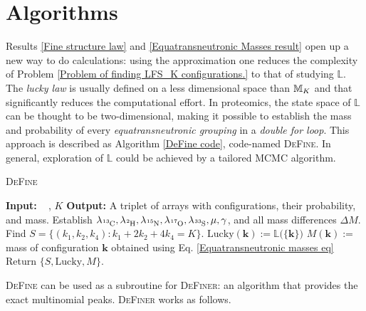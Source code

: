 \section{Algorithms}

Results \ref{Fine structure law} and \ref{Equatransneutronic Masses result} open up a new way to do calculations: using the approximation one reduces the complexity of Problem \ref{Problem of finding LFS_K configurations.} to that of studying $\mathbb{L}$. The {\it lucky law} is usually defined on a less dimensional space than $\mathbb{M}_K$ and that significantly reduces the  computational effort. In proteomics, the state space of $\mathbb{L}$ can be thought to be two-dimensional, making it possible to establish the mass and probability of every {\it equatransneutronic grouping} in a {\it double for loop}. This approach is described as Algorithm \ref{DeFine code}, code-named \textsc{DeFine}. In general, exploration of $\mathbb{L}$ could be achieved by a tailored MCMC algorithm.   

\begin{algorithm}\caption{\textsc{DeFine}}\label{DeFine code}
\begin{algorithmic}\label{DeFine Parallely}
	\State	\textbf{Input:}\,\,\,\,\, \molecule, $K$
	\State 	\textbf{Output:} A triplet of arrays with configurations, their probability, and mass.
	\State 	Establish $\lambda_\cem{^{13}C}, \lambda_\cem{^{2} H}, \lambda_\cem{^{15}N}, \lambda_\cem{^{17}O}, \lambda_\cem{^{33}S}, \mu, \gamma $, and all mass differences $\Delta M$.
	\State 	Find   $S = \{ (k_1, k_2, k_4) : k_1 + 2 k_2 + 4 k_4 = K \}$.
		\State 	$\mathrm{Lucky}(\bm{k}) := \mathbb{L}\Big( \{ \bm{k} \} \Big)$
		\State 	$M(\bm{k}) :=$ mass of configuration $\bm{k}$ obtained using Eq. \eqref{Equatransneutronic masses eq} 
	\ENDFORALL
	\State 	Return $\{ S, \mathrm{Lucky}, M\}$.
\end{algorithmic}	
\end{algorithm}

\textsc{DeFine} can be used as a subroutine for \textsc{DeFiner}: an algorithm that provides the exact multinomial peaks. \textsc{DeFiner} works as follows. 

